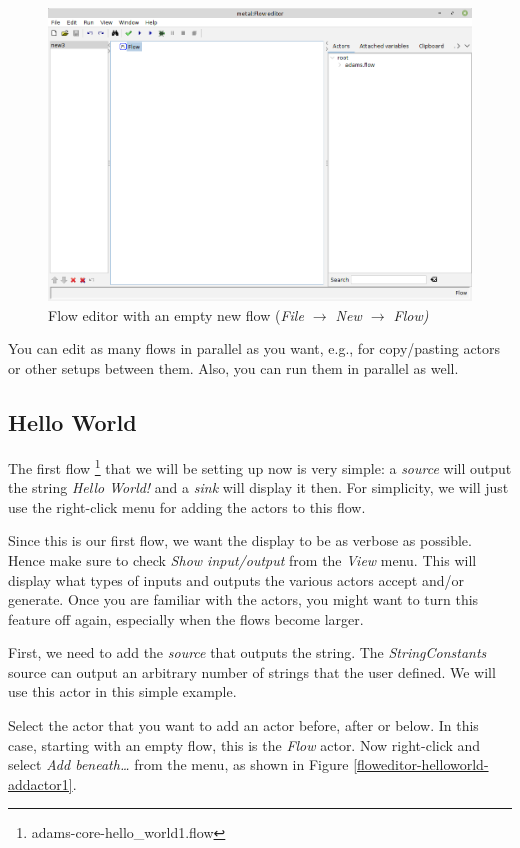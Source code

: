 \begin{figure}[htb]
  \centering
  \includegraphics[width=12.0cm]{images/floweditor-new.png}
  \caption{Flow editor with an empty new flow
  (\textit{File $\rightarrow$ New $\rightarrow$ Flow)}}
  \label{floweditor-newflow}
\end{figure}

You can edit as many flows in parallel as you want, e.g., for copy/pasting
actors or other setups between them. Also, you can run them in parallel as well.

\clearpage
\subsection{Hello World}
The first flow \footnote{adams-core-hello\_world1.flow} that we will be setting
up now is very simple: a \textit{source} will output the string \textit{Hello World!} and a \textit{sink} will display
it then. For simplicity, we will just use the right-click menu for adding the
actors to this flow.

Since this is our first flow, we want the display to be as
verbose as possible. Hence make sure to check \textit{Show input/output} from
the \textit{View} menu. This will display what types of inputs and outputs the
various actors accept and/or generate. Once you are familiar with the actors,
you might want to turn this feature off again, especially when the flows become
larger.

First, we need to add the \textit{source} that outputs the string. The
\textit{StringConstants} source can output an arbitrary number of strings that
the user defined. We will use this actor in this simple example.

Select the actor that you want to add an actor before, after or
below. In this case, starting with an empty flow, this is the
\textit{Flow} actor. Now right-click and select \textit{Add beneath\ldots} from
the menu, as shown in Figure \ref{floweditor-helloworld-addactor1}.


